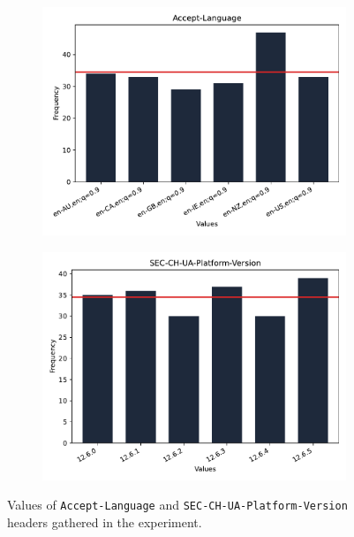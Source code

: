\medbreak

\begin{figure}[H]
\centering
\begin{subfigure}{.5\textwidth}
  \centering
  \includegraphics[width=\linewidth]{obrazky-figures/bar_chart_Accept-Language}
\end{subfigure}%
\begin{subfigure}{.5\textwidth}
  \centering
  \includegraphics[width=\linewidth]{obrazky-figures/bar_chart_SEC-CH-UA-Platform-Version}
\end{subfigure}
\caption{Values of \texttt{Accept-Language} and \texttt{SEC-CH-UA-Platform-Version} headers gathered in the experiment.}
\label{Fig:Exp1Frequencies}
\end{figure}

